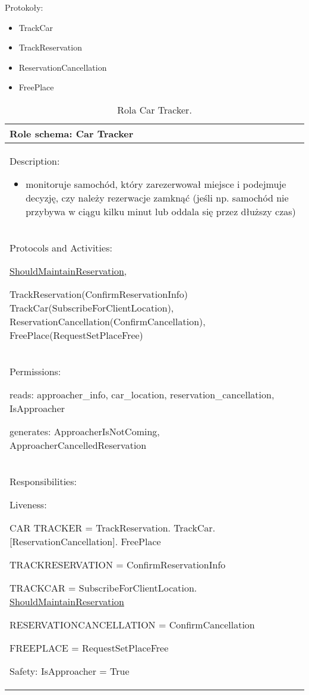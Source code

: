 Protokoły:
\begin{itemize}
    \item TrackCar
    \item TrackReservation 
    \item ReservationCancellation
    \item FreePlace 
    
\end{itemize}


\begin{table}[!h] \label{tab:rola1} \centering
    \caption{Rola Car Tracker.}
    \begin{tabular} {| p{14cm} |} \hline
        Role schema: Car Tracker \\ \hline
        Description:

        \begin{itemize}
            \item monitoruje samochód, który zarezerwował miejsce i podejmuje decyzję, czy należy rezerwacje zamknąć (jeśli np. samochód nie przybywa w ciągu kilku minut lub oddala się przez dłuższy czas)
        \end{itemize} \\ \hline
        Protocols and Activities: 
        
        \ul{ShouldMaintainReservation}, 
        
        TrackReservation(ConfirmReservationInfo) TrackCar(SubscribeForClientLocation), ReservationCancellation(ConfirmCancellation), FreePlace(RequestSetPlaceFree) \\ \hline
        Permissions:

        reads: approacher\_info, car\_location,  reservation\_cancellation, IsApproacher

        generates:  ApproacherIsNotComing, ApproacherCancelledReservation                                                                                   \\ \hline
        Responsibilities:

        Liveness: 
        
        CAR TRACKER = TrackReservation. TrackCar. [ReservationCancellation]. FreePlace

        TRACKRESERVATION = ConfirmReservationInfo

        TRACKCAR = SubscribeForClientLocation. \ul{ShouldMaintainReservation}

        RESERVATIONCANCELLATION = ConfirmCancellation

        FREEPLACE = RequestSetPlaceFree


        Safety: IsApproacher = True \\ \hline
    \end{tabular}
\end{table}

